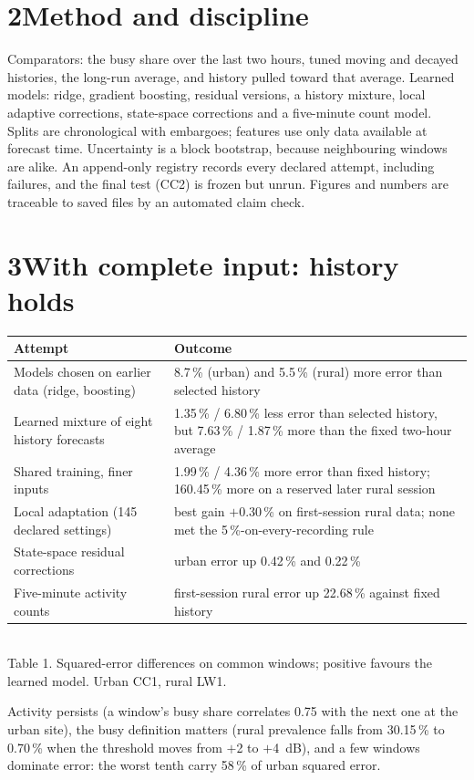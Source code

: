 \documentclass[10pt,a4paper]{article}
\begin{document}
\section*{2\quad Method and discipline}
Comparators: the busy share over the last two hours, tuned moving and decayed histories, the long-run average, and
history pulled toward that average. Learned models: ridge, gradient boosting, residual versions, a history mixture,
local adaptive corrections, state-space corrections and a five-minute count model. Splits are chronological with
embargoes; features use only data available at forecast time. Uncertainty is a block bootstrap, because neighbouring windows
are alike. An append-only registry records every declared attempt, including failures, and the final test (CC2) is
frozen but unrun. Figures and numbers are traceable to saved files by an automated claim check.

\section*{3\quad With complete input: history holds}
\begin{center}\small
\begin{tabular}{@{}p{6.6cm}p{9.3cm}@{}}\toprule
Attempt & Outcome\\\midrule
Models chosen on earlier data (ridge, boosting) & 8.7\,\% (urban) and 5.5\,\% (rural) more error than selected history\\
Learned mixture of eight history forecasts & 1.35\,\% / 6.80\,\% less error than selected history, but 7.63\,\% / 1.87\,\% more than the fixed two-hour average\\
Shared training, finer inputs & 1.99\,\% / 4.36\,\% more error than fixed history; 160.45\,\% more on a reserved later rural session\\
Local adaptation (145 declared settings) & best gain $+$0.30\,\% on first-session rural data; none met the 5\,\%-on-every-recording rule\\
State-space residual corrections & urban error up 0.42\,\% and 0.22\,\%\\
Five-minute activity counts & first-session rural error up 22.68\,\% against fixed history\\\bottomrule
\end{tabular}\\[2pt]
{\footnotesize Table 1. Squared-error differences on common windows; positive favours the learned model. Urban CC1, rural LW1.}
\end{center}
Activity persists (a window's busy share correlates 0.75 with the next one at the urban site), the busy definition
matters (rural prevalence falls from 30.15\,\% to 0.70\,\% when the threshold moves from $+$2 to $+$4~dB), and a few windows dominate
error: the worst tenth carry 58\,\% of urban squared error.
\end{document}
